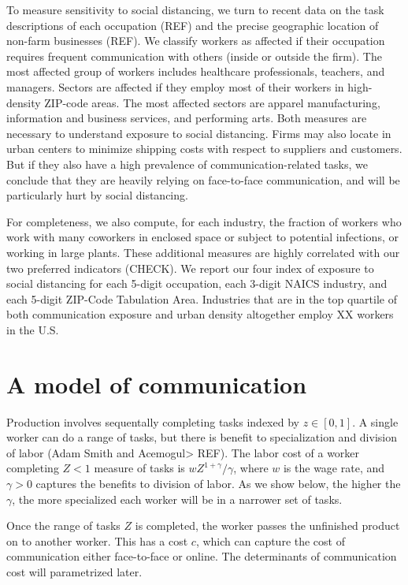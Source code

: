 \documentclass[10pt,letterpaper]{article}
\begin{document}
To measure sensitivity to social distancing, we turn to recent data on the task descriptions of each occupation (REF) and the precise geographic location of non-farm businesses (REF). We classify workers as affected if their occupation requires frequent communication with others (inside or outside the firm). The most affected group of workers includes healthcare professionals, teachers, and managers. Sectors are affected if they employ most of their workers in high-density ZIP-code areas. The most affected sectors are apparel manufacturing, information and business services, and performing arts. Both measures are necessary to understand exposure to social distancing. Firms may also locate in urban centers to minimize shipping costs with respect to suppliers and customers. But if they also have a high prevalence of communication-related tasks, we conclude that they are heavily relying on face-to-face communication, and will be particularly hurt by social distancing.

For completeness, we also compute, for each industry, the fraction of workers who work with many coworkers in enclosed space or subject to potential infections, or working in large plants. These additional measures are highly correlated with our two preferred indicators (CHECK). We report our four index of exposure to social distancing for each 5-digit occupation, each 3-digit NAICS industry, and each 5-digit ZIP-Code Tabulation Area. Industries that are in the top quartile of both  communication exposure and urban density altogether employ XX workers in the U.S.
\section{A model of communication}

Production involves sequentally completing tasks indexed by $z\in[0,1]$. A single worker can do a range of tasks, but there is benefit to specialization and division of labor (Adam Smith and Acemogul> REF). The labor cost of a worker completing $Z<1$ measure of tasks is $wZ^{1+\gamma}/\gamma$, where $w$ is the wage rate, and $\gamma>0$ captures the benefits to division of labor. As we show below, the higher the $\gamma$, the more specialized each worker will be in a narrower set of tasks.

Once the range of tasks $Z$ is completed, the worker passes the unfinished product on to another worker. This has a cost $c$, which can capture the cost of communication either face-to-face or online. The determinants of communication cost will parametrized later. 
\end{document}
